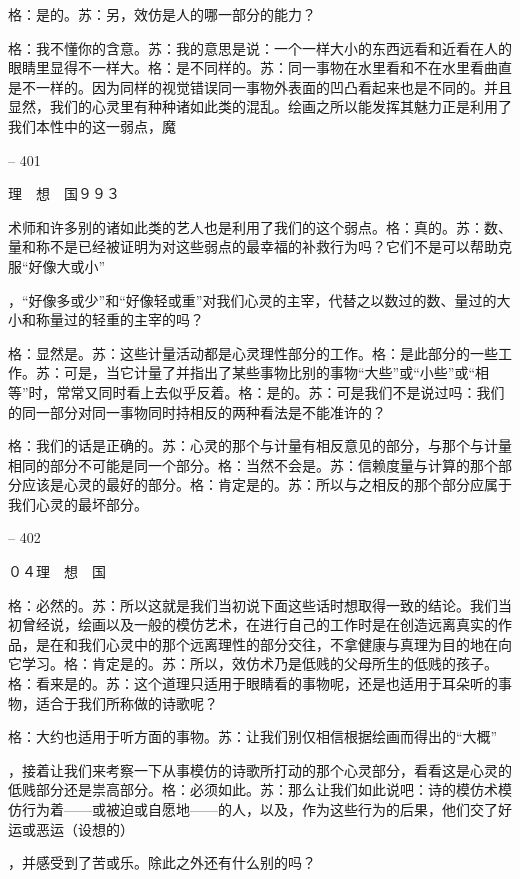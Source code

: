 \documentclass[11pt,oneside]{book}
\begin{document}
\begin{common-format}
    格：是的。苏：另，效仿是人的哪一部分的能力？

    格：我不懂你的含意。苏：我的意思是说：一个一样大小的东西远看和近看在人的眼睛里显得不一样大。格：是不同样的。苏：同一事物在水里看和不在水里看曲直是不一样的。因为同样的视觉错误同一事物外表面的凹凸看起来也是不同的。并且显然，我们的心灵里有种种诸如此类的混乱。绘画之所以能发挥其魅力正是利用了我们本性中的这一弱点，魔

    

-- 401

    理　想　国９９３

    术师和许多别的诸如此类的艺人也是利用了我们的这个弱点。格：真的。苏：数、量和称不是已经被证明为对这些弱点的最幸福的补救行为吗？它们不是可以帮助克服“好像大或小”

    ，“好像多或少”和“好像轻或重”对我们心灵的主宰，代替之以数过的数、量过的大小和称量过的轻重的主宰的吗？

    格：显然是。苏：这些计量活动都是心灵理性部分的工作。格：是此部分的一些工作。苏：可是，当它计量了并指出了某些事物比别的事物“大些”或“小些”或“相等”时，常常又同时看上去似乎反着。格：是的。苏：可是我们不是说过吗：我们的同一部分对同一事物同时持相反的两种看法是不能准许的？

    格：我们的话是正确的。苏：心灵的那个与计量有相反意见的部分，与那个与计量相同的部分不可能是同一个部分。格：当然不会是。苏：信赖度量与计算的那个部分应该是心灵的最好的部分。格：肯定是的。苏：所以与之相反的那个部分应属于我们心灵的最坏部分。

    

-- 402

    ０４理　想　国

    格：必然的。苏：所以这就是我们当初说下面这些话时想取得一致的结论。我们当初曾经说，绘画以及一般的模仿艺术，在进行自己的工作时是在创造远离真实的作品，是在和我们心灵中的那个远离理性的部分交往，不拿健康与真理为目的地在向它学习。格：肯定是的。苏：所以，效仿术乃是低贱的父母所生的低贱的孩子。格：看来是的。苏：这个道理只适用于眼睛看的事物呢，还是也适用于耳朵听的事物，适合于我们所称做的诗歌呢？

    格：大约也适用于听方面的事物。苏：让我们别仅相信根据绘画而得出的“大概”

    ，接着让我们来考察一下从事模仿的诗歌所打动的那个心灵部分，看看这是心灵的低贱部分还是祟高部分。格：必须如此。苏：那么让我们如此说吧：诗的模仿术模仿行为着——或被迫或自愿地——的人，以及，作为这些行为的后果，他们交了好运或恶运（设想的）

    ，并感受到了苦或乐。除此之外还有什么别的吗？


\end{common-format}
\end{document}
